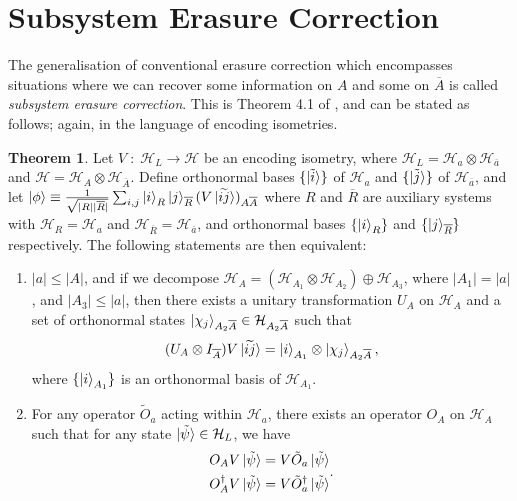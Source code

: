 \documentclass[12pt,a4paper]{report}
\numberwithin{equation}{section}
\newcommand{\ol}[1]{\overline{#1}}
\theoremstyle{definition}
\theoremstyle{theorem}
\newtheorem{theorem}{Theorem}[section]
\theoremstyle{theorem}
\theoremstyle{example}
\theoremstyle{definition}
\begin{document}
\section{Subsystem Erasure Correction}
The generalisation of conventional erasure correction which encompasses situations where we can recover some information on $A$ and some on $\ol{A}$ is called \textit{subsystem erasure correction}. This is Theorem 4.1 of \cite{Harlow}, and can be stated as follows; again, in the language of encoding isometries.
\begin{theorem}\label{t2}
	Let $V\;:\;\mathcal{H}_{L}\to\mathcal{H}$ be an encoding isometry, where $\mathcal{H}_{L}=\mathcal{H}_{a}\otimes\mathcal{H}_{\ol{a}}$ and $\mathcal{H}=\mathcal{H}_{A}\otimes\mathcal{H}_{\ol{A}}$. Define orthonormal bases $\{\ket{\tilde{i}}\}$ of $\mathcal{H}_{a}$ and $\{\ket{\tilde{j}}\}$ of $\mathcal{H}_{\ol{a}}$, and let $\ket{\phi}\equiv\frac{1}{\sqrt{|R||\ol{R}|}}\sum_{i,j}\ket{i}_{R}\ket{j}_{\ol{R}}(V\ket{\widetilde{ij}})_{A\ol{A}}$ where $R$ and $\ol{R}$ are auxiliary systems with $\mathcal{H}_{R}=\mathcal{H}_{a}$ and $\mathcal{H}_{\ol{R}}=\mathcal{H}_{\ol{a}}$, and orthonormal bases $\{\ket{i}_{R}\}$ and $\{\ket{j}_{\ol{R}}\}$ respectively. The following statements are then equivalent:
	\begin{enumerate}
		\item $|a|\leq|A|$, and if we decompose $\mathcal{H}_{A}=(\mathcal{H}_{A_{1}}\otimes\mathcal{H}_{A_{2}})\oplus\mathcal{H}_{A_{3}}$, where $|A_{1}|=|a|$, and $|A_{3}|\leq |a|$, then there exists a unitary transformation $U_{A}$ on $\mathcal{H}_{A}$ and a set of orthonormal states $\ket{\chi_{j}}_{A_{2}\ol{A}}\in\mathcal{H}_{A_{2}\ol{A}}$ such that
		\begin{equation}\label{S1}
			(U_{A}\otimes I_{\ol{A}})V\ket{\widetilde{ij}}=\ket{i}_{A_{1}}\otimes\ket{\chi_{j}}_{A_{2}\ol{A}},
		\end{equation}
		where $\{\ket{i}_{A_{1}}\}$ is an orthonormal basis of $\mathcal{H}_{A_{1}}$.
		\item For any operator $\tilde{O}_{a}$ acting within $\mathcal{H}_{a}$, there exists an operator $O_{A}$ on $\mathcal{H}_{A}$ such that for any state $\ket{\tilde{\psi}}\in\mathcal{H}_{L}$, we have
		\begin{equation}\label{S2}
			\begin{aligned}
				O_{A}V\ket{\tilde{\psi}}&=V\tilde{O}_{a}\ket{\tilde{\psi}}\\
				O_{A}^{\dagger}V\ket{\tilde{\psi}}&=V\tilde{O}_{a}^{\dagger}\ket{\tilde{\psi}}
			\end{aligned}.

\end{equation}
\end{enumerate}
\end{theorem}
\end{document}
